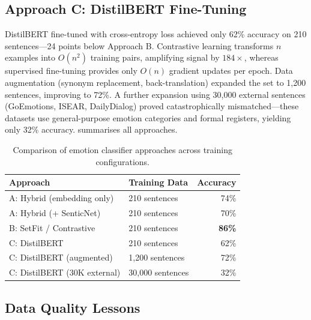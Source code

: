 \subsection{Approach C: DistilBERT Fine-Tuning}
\label{subsec:approach-c}

DistilBERT fine-tuned with cross-entropy loss achieved only 62\% accuracy on 210 sentences---24 points below Approach B. Contrastive learning transforms $n$ examples into $O(n^2)$ training pairs, amplifying signal by $184\times$, whereas supervised fine-tuning provides only $O(n)$ gradient updates per epoch. Data augmentation (synonym replacement, back-translation) expanded the set to 1{,}200 sentences, improving to 72\%. A further expansion using 30{,}000 external sentences (GoEmotions, ISEAR, DailyDialog) proved catastrophically mismatched---these datasets use general-purpose emotion categories and formal registers, yielding only 32\% accuracy.  summarises all approaches.

\begin{table}[htbp]
  \centering
  \caption{Comparison of emotion classifier approaches across training configurations.}
  \label{tab:classifier-comparison}
  \begin{tabular}{@{}llr@{}}
    \toprule
    \textbf{Approach} & \textbf{Training Data} & \textbf{Accuracy} \\
    \midrule
    A: Hybrid (embedding only)     & 210 sentences     & 74\% \\
    A: Hybrid (+ SenticNet)        & 210 sentences     & 70\% \\
    B: SetFit / Contrastive        & 210 sentences     & \textbf{86\%} \\
    C: DistilBERT                  & 210 sentences     & 62\% \\
    C: DistilBERT (augmented)      & 1{,}200 sentences & 72\% \\
    C: DistilBERT (30K external)   & 30{,}000 sentences & 32\% \\
    \bottomrule
  \end{tabular}
\end{table}

\subsection{Data Quality Lessons}
\label{subsec:data-quality}

